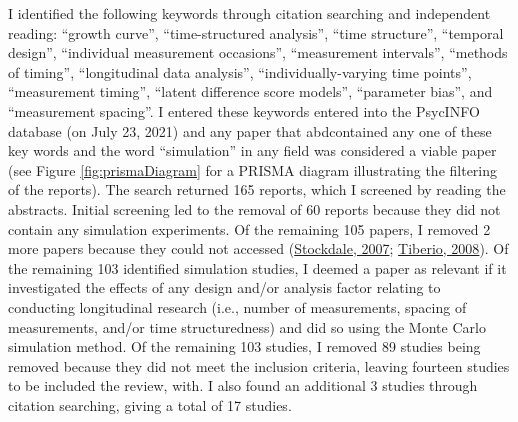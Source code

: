 \documentclass[
12pt, %
twoside,
english]{guelphthesis}
\begin{document}
I identified the following keywords through citation searching and independent reading: ``growth curve'', ``time-structured analysis'', ``time structure'', ``temporal design'', ``individual measurement occasions'', ``measurement intervals'', ``methods of timing'', ``longitudinal data analysis'', ``individually-varying time points'', ``measurement timing'', ``latent difference score models'', ``parameter bias'', and ``measurement spacing''. I entered these keywords entered into the PsycINFO database (on July 23, 2021) and any paper that abdcontained any one of these key words and the word ``simulation'' in any field was considered a viable paper (see Figure \ref{fig:prismaDiagram} for a PRISMA diagram illustrating the filtering of the reports). The search returned 165 reports, which I screened by reading the abstracts. Initial screening led to the removal of 60 reports because they did not contain any simulation experiments. Of the remaining 105 papers, I removed 2 more papers because they could not accessed (\protect\hyperlink{ref-stockdale2007}{Stockdale, 2007}; \protect\hyperlink{ref-tiberio2008}{Tiberio, 2008}). Of the remaining 103 identified simulation studies, I deemed a paper as relevant if it investigated the effects of any design and/or analysis factor relating to conducting longitudinal research (i.e., number of measurements, spacing of measurements, and/or time structuredness) and did so using the Monte Carlo simulation method. Of the remaining 103 studies, I removed 89 studies being removed because they did not meet the inclusion criteria, leaving fourteen studies to be included the review, with. I also found an additional 3 studies through citation searching, giving a total of 17 studies.
\end{document}
